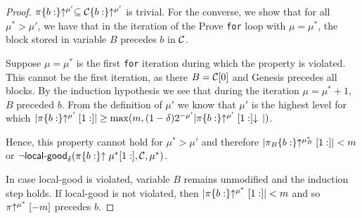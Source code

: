 \begin{proof}
    $\pi\{b:\}\negthickspace\uparrow^{\mu'} \subseteq \mathcal{C}\{b:\}\negthickspace\uparrow^{\mu'}$ is trivial.
    For the converse, we show that for all $\mu^* > \mu'$, we have that in
    the iteration of the Prove \texttt{for} loop with $\mu = \mu^*$, the block
    stored in variable $B$ precedes $b$ in $\mathcal{C}$.

    Suppose $\mu = \mu^*$ is the first \texttt{for} iteration during which the
    property is violated. This cannot be the first iteration, as there
    $B = \mathcal{C}[0]$ and Genesis precedes all blocks. By the
    induction hypothesis we see that during the iteration $\mu = \mu^* + 1$,
    $B$ preceded $b$. From the definition of $\mu'$ we know
    that $\mu'$ is the highest level for which
    $|\pi\{b:\}\negthickspace\uparrow^{\mu'}[1:]|
    \geq \max(m, (1 -
    \delta)2^{-\mu'}|\pi\{b:\}\negthickspace\uparrow^{\mu'}[1:]\negthickspace\downarrow\,|)$.

    Hence, this
    property cannot hold for $\mu^* > \mu'$ and therefore
    $|\pi_B\{b:\}\negthickspace\uparrow^{\mu_B^*}[1:]| < m$ or $\lnot
    \textsf{local-good}_\delta(\pi\{b:\}\negthickspace\uparrow{\mu^*}[1:], \mathcal{C}, \mu^*)$.

    In case \textsf{local-good} is violated, variable $B$ remains unmodified and
    the induction step holds. If \textsf{local-good} is not violated, then
    $|\pi\{b:\}\negthickspace\uparrow^{\mu^*}[1:]| < m$ and so $\pi\negthickspace\uparrow^{\mu^*}[-m]$
    precedes $b$.
    \Qed
\end{proof}
